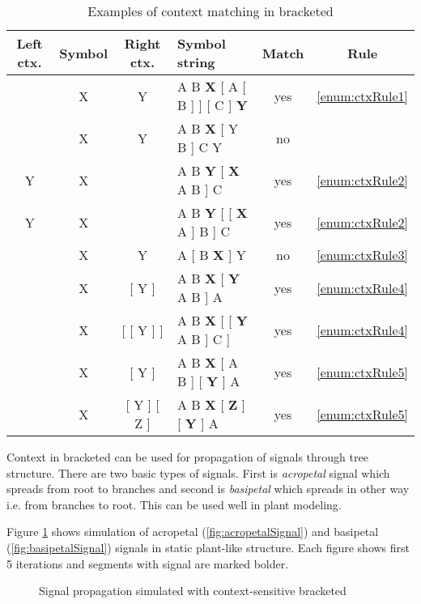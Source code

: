 \begin{table}[h]
	\centering
	\begin{tabular}{c c c p{128pt} c c}
   		\toprule
   		Left ctx. & Symbol & Right ctx. & Symbol string & Match & Rule\\
   		\midrule
		 & X & Y & A B \textbf{X} [ A [ B ] ] [ C ] \textbf{Y} & yes & \ref{enum:ctxRule1} \\
		 & X & Y & A B \textbf{X} [ Y B ] C Y & no &  \\
		 Y & X & & A B \textbf{Y} [ \textbf{X} A B ] C & yes & \ref{enum:ctxRule2} \\
		 Y & X & & A B \textbf{Y} [ [ \textbf{X} A ] B ] C & yes & \ref{enum:ctxRule2} \\
		 & X & Y & A [ B \textbf{X} ] Y & no & \ref{enum:ctxRule3} \\
		 & X & [ Y ] & A B \textbf{X} [ \textbf{Y} A B ] A  & yes & \ref{enum:ctxRule4} \\
		 & X & [ [ Y ] ] & A B \textbf{X} [ [ \textbf{Y} A B ] C ] & yes & \ref{enum:ctxRule4} \\
		 & X & [ Y ] & A B \textbf{X} [ A B ] [ \textbf{Y} ] A  & yes & \ref{enum:ctxRule5} \\
		 & X & [ Y ] [ Z ] & A B \textbf{X} [ \textbf{Z} ] [ \textbf{Y} ] A  & yes & \ref{enum:ctxRule5} \\
		\bottomrule
	\end{tabular}
	\caption{Examples of context matching in bracketed \lsystems}
	\label{tbl:bracketCtxt}
\end{table}

Context in bracketed \lsystems can be used for propagation of signals through tree structure.
There are two basic types of signals.
First is \emph{acropetal} signal which spreads from root to branches and second is \emph{basipetal} which spreads in other way i.e. from branches to root.
This can be used well in plant modeling.

Figure \ref{fig:signalPropagation} shows simulation of acropetal (\ref{fig:acropetalSignal}) and basipetal (\ref{fig:basipetalSignal}) signals in static plant-like structure.
Each figure shows first 5 iterations and segments with signal are marked bolder.

\begin{figure}[h!]
	\centering
	\hspace{2mm}
	\caption{Signal propagation simulated with context-sensitive bracketed \lsystems}
	\label{fig:signalPropagation}
\end{figure}


